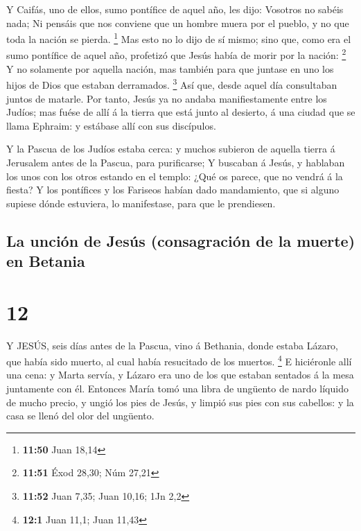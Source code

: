  Y Caifás, uno de ellos, sumo pontífice de aquel año, les
dijo: Vosotros no sabéis nada;  Ni pensáis que nos conviene
que un hombre muera por el pueblo, y no que toda la nación se pierda.
\footnote{\textbf{11:50} Juan 18,14}  Mas esto no lo dijo
de sí mismo; sino que, como era el sumo pontífice de aquel año,
profetizó que Jesús había de morir por la nación: \footnote{\textbf{11:51}
  Éxod 28,30; Núm 27,21}  Y no solamente por aquella
nación, mas también para que juntase en uno los hijos de Dios que
estaban derramados. \footnote{\textbf{11:52} Juan 7,35; Juan 10,16; 1Jn
  2,2}  Así que, desde aquel día consultaban juntos de
matarle.  Por tanto, Jesús ya no andaba manifiestamente
entre los Judíos; mas fuése de allí á la tierra que está junto al
desierto, á una ciudad que se llama Ephraim: y estábase allí con sus
discípulos.

 Y la Pascua de los Judíos estaba cerca: y muchos subieron
de aquella tierra á Jerusalem antes de la Pascua, para purificarse;
 Y buscaban á Jesús, y hablaban los unos con los otros
estando en el templo: ¿Qué os parece, que no vendrá á la fiesta?
 Y los pontífices y los Fariseos habían dado mandamiento,
que si alguno supiese dónde estuviera, lo manifestase, para que le
prendiesen.

\hypertarget{la-unciuxf3n-de-jesuxfas-consagraciuxf3n-de-la-muerte-en-betania}{%
\subsection{La unción de Jesús (consagración de la muerte) en
Betania}\label{la-unciuxf3n-de-jesuxfas-consagraciuxf3n-de-la-muerte-en-betania}}

\hypertarget{section-11}{%
\section{12}\label{section-11}}

 Y JESÚS, seis días antes de la Pascua, vino á Bethania,
donde estaba Lázaro, que había sido muerto, al cual había resucitado de
los muertos. \footnote{\textbf{12:1} Juan 11,1; Juan 11,43} 
E hiciéronle allí una cena: y Marta servía, y Lázaro era uno de los que
estaban sentados á la mesa juntamente con él.  Entonces
María tomó una libra de ungüento de nardo líquido de mucho precio, y
ungió los pies de Jesús, y limpió sus pies con sus cabellos: y la casa
se llenó del olor del ungüento.

